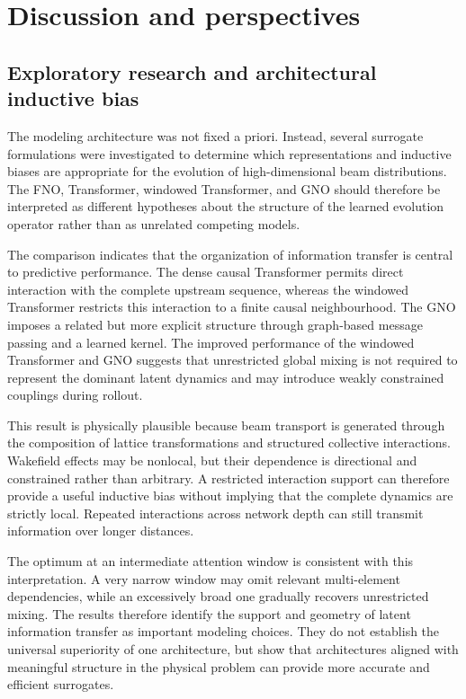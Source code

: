 \section{Discussion and perspectives}
\label{sec:discussion}

\subsection{Exploratory research and architectural inductive bias}
\label{subsec:exploratory_inductive_bias}

The modeling architecture was not fixed a priori. Instead, several surrogate formulations were investigated to determine which representations and inductive biases are appropriate for the evolution of high-dimensional beam distributions. The FNO, Transformer, windowed Transformer, and GNO should therefore be interpreted as different hypotheses about the structure of the learned evolution operator rather than as unrelated competing models.

The comparison indicates that the organization of information transfer is central to predictive performance. The dense causal Transformer permits direct interaction with the complete upstream sequence, whereas the windowed Transformer restricts this interaction to a finite causal neighbourhood. The GNO imposes a related but more explicit structure through graph-based message passing and a learned kernel. The improved performance of the windowed Transformer and GNO suggests that unrestricted global mixing is not required to represent the dominant latent dynamics and may introduce weakly constrained couplings during rollout.

This result is physically plausible because beam transport is generated through the composition of lattice transformations and structured collective interactions. Wakefield effects may be nonlocal, but their dependence is directional and constrained rather than arbitrary. A restricted interaction support can therefore provide a useful inductive bias without implying that the complete dynamics are strictly local. Repeated interactions across network depth can still transmit information over longer distances.

The optimum at an intermediate attention window is consistent with this interpretation. A very narrow window may omit relevant multi-element dependencies, while an excessively broad one gradually recovers unrestricted mixing. The results therefore identify the support and geometry of latent information transfer as important modeling choices. They do not establish the universal superiority of one architecture, but show that architectures aligned with meaningful structure in the physical problem can provide more accurate and efficient surrogates.

